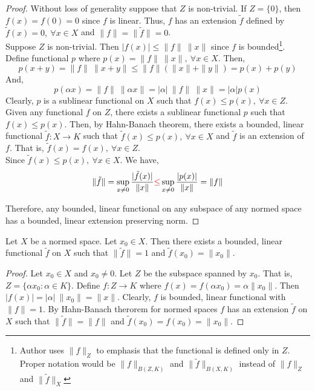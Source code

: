 \begin{proof}
	Without loss of generality suppose that $Z$ is non-trivial.
	If $Z = \{ 0 \}$, then $f(x) = f(0) = 0$ since $f$ is linear.
	Thus, $f$ has an extension $\tilde{f}$ defined by $\tilde{f}(x) = 0,\ \forall x \in X$ and $\|f\| = \|\tilde{f}\| = 0$.\\
	
	Suppose $Z$ is non-trivial.
	Then $|f(x)| \le \|f\| \ \|x\|$ since $f$ is bounded\dag\footnote{
		Author uses $\|f\|_Z$ to emphasis that the functional is defined only in $Z$.
		Proper notation would be $\|f\|_{B(Z,K)}$ and $\| \tilde{f}\|_{B(X,K)}$ instead of $\|f\|_Z$ and $\|\tilde{f}\|_X$}.
	Define functional $p$ where $p(x) = \|f\| \ \|x\|,\ \forall x \in X$.
	Then,
	\[ p(x+y) = \|f\| \ \|x+y\| \le \|f\| (\|x\|+\|y\|) = p(x) + p(y) \]
	And,
	\[ p(\alpha x) = \|f\| \ \|\alpha x\| = |\alpha| \ \|f\| \ \|x\| = |\alpha| p(x) \]
	Clearly, $p$ is a sublinear functional on $X$ such that $f(x) \le p(x),\ \forall x \in Z$. \\

	Given any functional $f$ on $Z$, there exists a sublinear functional $p$ such that $f(x) \le p(x)$.
	Then, by Hahn-Banach theorem, there exists a bounded, linear functional $\tilde{f} : X \to K$ such that $\tilde{f}(x) \le p(x),\ \forall x \in X$ and $\tilde{f}$ is an extension of $f$.
	That is, $\tilde{f}(x) = f(x),\ \forall x \in Z$.\\
	
	Since $\tilde{f}(x) \le p(x), \ \forall x \in X$.
	We have, \[ \|\tilde{f}\| = \sup_{x \ne 0} \frac{|\tilde{f}(x)|}{\|x\|} {\color{red}\le} \sup_{x \ne 0} \frac{|p(x)|}{\|x\|} = \|f\| \]

	Therefore, any bounded, linear functional on any subspace of any normed space has a bounded, linear extension preserving norm.
\end{proof}

\begin{theorem}
	Let $X$ be a normed space.
	Let $x_0 \in X$.
	Then there exists a bounded, linear functional $\tilde{f}$ on $X$ such that $\|\tilde{f}\| = 1$ and $\tilde{f}(x_0) = \|x_0\|$.
\end{theorem}
\begin{proof}
	Let $x_0 \in X$ and $x_0 \ne 0$.
	Let $Z$ be the subspace spanned by $x_0$.
	That is, $Z = \{ \alpha x_0 : \alpha \in K\}$.
	Define $f : Z \to K$ where $f(x) = f(\alpha x_0) = \alpha \|x_0\|$.
	Then $|f(x)| = |\alpha| \ \|x_0\| = \|x\|$.
	Clearly, $f$ is bounded, linear functional with $\|f\|=1$.
	By Hahn-Banach therorem for normed spaces $f$ has an extension $\tilde{f}$ on $X$ such that $\|\tilde{f}\| = \|f\|$ and $\tilde{f}(x_0) = f(x_0) = \|x_0\|$.
\end{proof}


